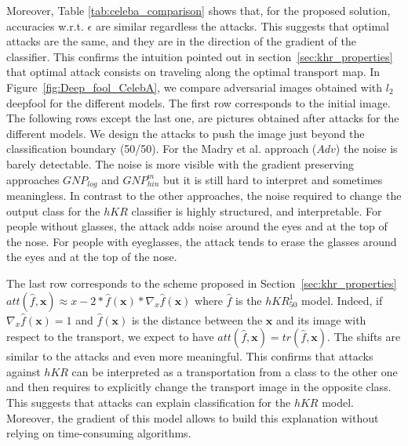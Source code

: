 Moreover, Table \ref{tab:celeba_comparison} shows that, for the proposed solution, accuracies w.r.t. $\epsilon$ are similar regardless the attacks. This suggests that optimal attacks are the same, and they are in the direction of the gradient of the classifier. This confirms the intuition pointed out in section~\ref{sec:khr_properties} that optimal attack consists on traveling along the optimal transport map. In Figure~\ref{fig:Deep_fool_CelebA}, we compare adversarial images obtained with $l_2$ deepfool for the different models. The first row corresponds to the initial image. The following rows except the last one, are pictures obtained after attacks for the different models. We design the attacks to push the image just beyond the classification boundary (50/50).  For the Madry et al. approach ($Adv$) the noise is barely detectable. The noise is more visible with the gradient preserving approaches $GNP_{log}$ and $GNP^m_{hin}$ but it is still hard to interpret and sometimes meaningless. In contrast to the other approaches, the noise required to change the output class for the $hKR$ classifier is highly structured, and interpretable. For people without glasses, the attack adds noise around the eyes and at the top of the nose. For people with eyeglasses, the attack tends to erase the glasses around the eyes and at the top of the nose. 

The last row corresponds to the scheme proposed in Section~\ref{sec:khr_properties} $att(\hat{f},\textbf{x})\approx x-2*\hat{f}(\textbf{x})*\nabla_x \hat{f}(\textbf{x})$ where $\hat{f}$ is the $hKR^1_{50}$ model. Indeed, if $\nabla_x \hat{f}(\textbf{x})=1$ and $\hat{f}(\textbf{x})$ is the distance between the $\textbf{x}$ and its image with respect to the transport, we expect to have $att(\hat{f},\textbf{x})=tr(\hat{f},\textbf{x})$. The  shifts are similar to the attacks and even more meaningful. This confirms that attacks against $hKR$ can be interpreted as a transportation from a class to the other one and then requires to explicitly change the transport image in the opposite class. This suggests that attacks can explain classification for the $hKR$ model. Moreover, the gradient of this model allows to build this explanation without relying on time-consuming algorithms.  



